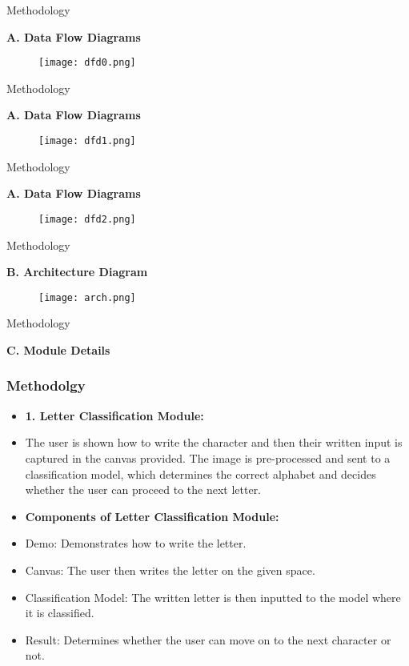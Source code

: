 \documentclass[aspectratio=169]{beamer}
\begin{document}
\begin{frame}{Methodology}
\item \textbf{A. Data Flow Diagrams}
    \begin{figure}
        \centering
        \texttt{[image: dfd0.png]}
    \end{figure}
\end{frame}
\begin{frame}{Methodology}
\item \textbf{A. Data Flow Diagrams}
    \begin{figure}
        \centering
        \texttt{[image: dfd1.png]}
    \end{figure}
\end{frame}
\begin{frame}{Methodology}
\item \textbf{A. Data Flow Diagrams}
    \begin{figure}
        \centering
        \texttt{[image: dfd2.png]}
    \end{figure}
\end{frame}

\begin{frame}{Methodology}
\item \textbf{B. Architecture Diagram}
\begin{figure}
        \centering
        \texttt{[image: arch.png]}
    \end{figure}
\end{frame}
    
\begin{frame}{Methodology}
\item \textbf{C. Module Details}

    \frametitle{Methodolgy}
    \begin{itemize}
        \item\textbf{1. Letter Classification Module: }
            \item The user is shown how to write the character and then their written input is captured in the canvas provided. The image is pre-processed and sent to a classification model, which determines the correct alphabet and decides whether the user can proceed to the next letter.
    \end{itemize}
    \begin{itemize}
            \item \textbf{Components of Letter Classification Module:}
            \item Demo: Demonstrates how to write the letter.
            \item Canvas: The user then writes the letter on the given space.
            \item Classification Model: The written letter is then inputted to the model where it is classified.
            \item Result: Determines whether the user can move on to the next character or not.
        \end{itemize}
\end{frame}
\end{document}

